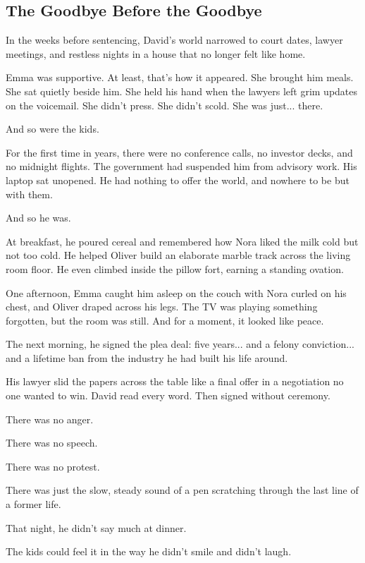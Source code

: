 
\subsection{The Goodbye Before the Goodbye}

In the weeks before sentencing, David’s world narrowed to court dates, lawyer meetings, and restless  
nights in a house that no longer felt like home.

Emma was supportive. At least, that’s how it appeared.  
She brought him meals. She sat quietly beside him. She held his hand when the lawyers left grim updates on 
the voicemail.  
She didn’t press. She didn’t scold. She was just... there.

And so were the kids.

For the first time in years, there were no conference calls, no investor decks, and no midnight flights.  
The government had suspended him from advisory work. His laptop sat unopened.  
He had nothing to offer the world, and nowhere to be but with them.

And so he was.

At breakfast, he poured cereal and remembered how Nora liked the milk cold but not too cold.  
He helped Oliver build an elaborate marble track across the living room floor. He even climbed inside 
the pillow fort, earning a standing ovation.

One afternoon, Emma caught him asleep on the couch with Nora curled on his chest, and Oliver draped  
across his legs.  
The TV was playing something forgotten, but the room was still.  
And for a moment, it looked like peace.

The next morning, he signed the plea deal:
five years...  
and a felony conviction...  
and a lifetime ban from the industry he had built his life around.

His lawyer slid the papers across the table like a final offer in a negotiation no one wanted to win.  
David read every word. Then signed without ceremony.

There was no anger. 

There was no speech. 

There was no protest.  

There was just the slow, steady sound of a pen scratching through the last line of a former life.

That night, he didn’t say much at dinner.  

The kids could feel it in the way he didn't smile and didn't laugh.  

